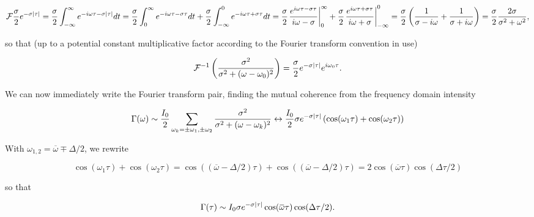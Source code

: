 {\begin{dmath}\label{eqn:modernOptics:problemSet3:1:340}
\FF \frac{\sigma}{2} e^{-\sigma \Abs{\tau}}
=
\frac{\sigma}{2} \int_{-\infty}^\infty e^{-i\omega \tau - \sigma \Abs{\tau}} dt
=
\frac{\sigma}{2} \int_0^\infty e^{-i\omega \tau - \sigma \tau} dt
+\frac{\sigma}{2} \int_{-\infty}^0 e^{-i\omega \tau + \sigma \tau} dt
=
\frac{\sigma}{2} \evalrange{
\frac{ e^{i\omega \tau - \sigma \tau} }{
i \omega - \sigma
}
}
{ 0 } { \infty }
+
\frac{\sigma}{2} \evalrange{
\frac{ e^{i\omega \tau + \sigma \tau} }{
i \omega + \sigma
}
}
{ -\infty }{0}
=
\frac{\sigma}{2} \left(
\inv{\sigma - i \omega}
+\inv{\sigma + i \omega}
\right)
=
\frac{\sigma}{2} \frac{2 \sigma}{ \sigma^2 + \omega^2 },
\end{dmath}

so that (up to a potential constant multiplicative factor according to the Fourier transform convention in use)

\begin{dmath}\label{eqn:modernOptics:problemSet3:1:360}
\FF^{-1}
\left(
\frac{\sigma^2}
{
\sigma^2 + (\omega - \omega_0)^2
}
\right)
=
\frac{\sigma}{2} e^{-\sigma \Abs{\tau}} e^{i \omega_0 \tau}.
\end{dmath}

We can now immediately write the Fourier transform pair, finding the mutual coherence from the frequency domain intensity

\begin{dmath}\label{eqn:modernOptics:problemSet3:1:380}
\Gamma(\omega) \sim \frac{I_0}{2} \sum_{\omega_k = \pm \omega_1, \pm \omega_2}
\frac{\sigma^2}{\sigma^2 + (\omega - \omega_k)^2}
\leftrightarrow
\frac{I_0}{2}
\sigma e^{-\sigma \Abs{\tau}} \left(
\cos(\omega_1 \tau)
+\cos(\omega_2 \tau)
\right)
\end{dmath}

With $\omega_{1,2} = \overbar{\omega} \mp \Delta/2$, we rewrite

\begin{dmath}\label{eqn:modernOptics:problemSet3:1:400}
\cos(\omega_1 \tau) +\cos(\omega_2 \tau)
=
\cos\left(
\left(
\overbar{\omega} - \Delta/2
\right) \tau
\right)
+
\cos\left(
\left(
\overbar{\omega} - \Delta/2
\right) \tau
\right)
= 2 \cos( \overbar{\omega} \tau ) \cos ( \Delta \tau/2 )
\end{dmath}

so that

\begin{dmath}\label{eqn:modernOptics:problemSet3:1:420}
\Gamma(\tau) \sim
I_0
\sigma e^{-\sigma \Abs{\tau}}
\cos( \overbar{\omega} \tau ) \cos ( \Delta \tau /2 ).
\end{dmath}

}
